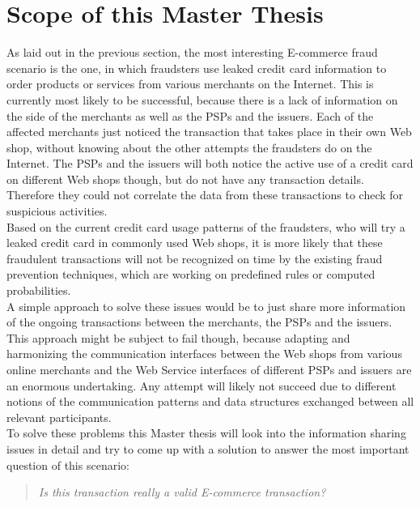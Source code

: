 
\section{Scope of this Master Thesis}
\label{sec:scope_thesis}

As laid out in the previous section, the most interesting \gls{E-commerce} fraud scenario is the one, in which fraudsters use leaked credit card information to order products or services from various merchants on the Internet. This is currently most likely to be successful, because there is a lack of information on the side of the merchants as well as the \gls{PSP}s and the issuers. Each of the affected merchants just noticed the transaction that takes place in their own Web shop, without knowing about the other attempts the fraudsters do on the Internet. The \gls{PSP}s and the issuers will both notice the active use of a credit card on different Web shops though, but do not have any transaction details. Therefore they could not correlate the data from these transactions to check for suspicious activities. \\

Based on the current credit card usage patterns of the fraudsters, who will try a leaked credit card in commonly used Web shops, it is more likely that these fraudulent transactions will not be recognized on time by the existing fraud prevention techniques, which are working on predefined rules or computed probabilities. \\

A simple approach to solve these issues would be to just share more information of the ongoing transactions between the merchants, the \gls{PSP}s and the issuers. This approach might be subject to fail though, because adapting and harmonizing the communication interfaces between the Web shops from various online merchants and the Web Service interfaces of different \gls{PSP}s and issuers are an enormous undertaking. Any attempt will likely not succeed due to different notions of the communication patterns and data structures exchanged between all relevant participants. \\

To solve these problems this Master thesis will look into the information sharing issues in detail and try to come up with a solution to answer the most important question of this scenario: \@

\begin{quotation}
  \textit{Is this transaction really a valid \gls{E-commerce} transaction?}
\end{quotation}

